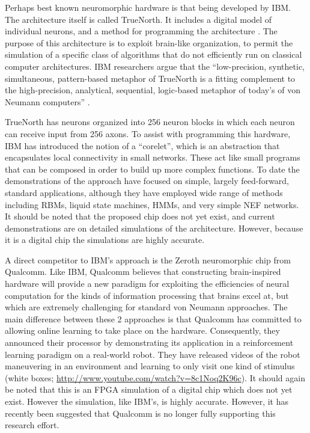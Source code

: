 \documentclass[english]{article}
\begin{document}
Perhaps best known neuromorphic hardware is that being developed by IBM.  The architecture itself is called TrueNorth. It includes a digital model of individual neurons, and a method for programming the architecture \cite{Esser2013}.  The purpose of this architecture is to exploit brain-like organization, to permit the simulation of a specific class of algorithms that do not efficiently run on classical computer architectures. IBM researchers argue that the ``low-precision, synthetic, simultaneous, pattern-based metaphor of TrueNorth is a fitting complement to the high-precision, analytical, sequential, logic-based metaphor of today's of von Neumann computers'' \cite[p.~1]{Esser2013}. 

TrueNorth has neurons organized into 256 neuron blocks in which each neuron can receive input from 256 axons. To assist with programming this hardware, IBM has introduced the notion of a ``corelet'', which is an abstraction that encapsulates local connectivity in small networks. These act like small programs that can be composed in order to build up more complex functions. To date the demonstrations of the approach have focused on simple, largely feed-forward, standard applications, although they have employed wide range of methods including RBMs, liquid state machines, HMMs, and very simple NEF networks. It should be noted that the proposed chip does not yet exist, and current demonstrations are on detailed simulations of the architecture. However, because it is a digital chip the simulations are highly accurate.

A direct competitor to IBM's approach is the Zeroth neuromorphic chip from Qualcomm. Like IBM, Qualcomm believes that constructing brain-inspired hardware will provide a new paradigm for exploiting the efficiencies of neural computation for the kinds of information processing that brains excel at, but which are extremely challenging for standard von Neumann approaches. The main difference between these 2 approaches is that Qualcomm has committed to allowing online learning to take place on the hardware. Consequently, they announced their processor by demonstrating its application in a reinforcement learning paradigm on a real-world robot. They have released videos of the robot maneuvering in an environment and learning to only visit one kind of stimulus (white boxes; \url{http://www.youtube.com/watch?v=8c1Noq2K96c}). It should again be noted that this is an FPGA simulation of a digital chip which does not yet exist. However the simulation, like IBM's, is highly accurate.  However, it has recently been suggested that Qualcomm is no longer fully supporting this research effort.
\end{document}
